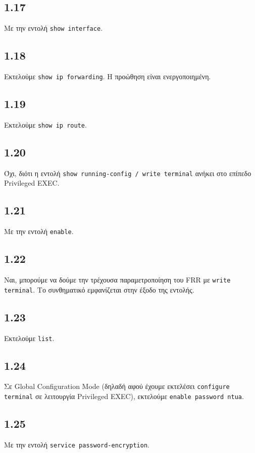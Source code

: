 \documentclass[a4paper, 12pt]{article}
\begin{document}
	\subsection*{1.17}
		Με την εντολή \verb|show interface|.

	\subsection*{1.18} 
		Εκτελούμε \verb|show ip forwarding|. Η προώθηση είναι ενεργοποιημένη.

	\subsection*{1.19}
		Εκτελούμε \verb|show ip route|.

	\subsection*{1.20}
		Όχι, διότι η εντολή \verb|show running-config / write terminal| ανήκει στο επίπεδο Privileged EXEC.

	\subsection*{1.21}
		Με την εντολή \verb|enable|.

	\subsection*{1.22}
		Ναι, μπορούμε να δούμε την τρέχουσα παραμετροποίηση του FRR με \verb|write terminal|. Το συνθηματικό εμφανίζεται στην έξοδο της εντολής. 

	\subsection*{1.23}
		Εκτελούμε \verb|list|.

	\subsection*{1.24}
		Σε Global Configuration Mode (δηλαδή αφού έχουμε εκτελέσει \verb|configure terminal| σε λειτουργία Privileged EXEC), εκτελούμε \verb|enable password ntua|.

	\subsection*{1.25}
		Mε την εντολή \verb|service password-encryption|.
\end{document}
